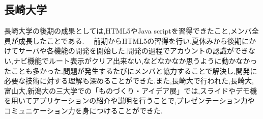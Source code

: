 \subsection{長崎大学}
長崎大学の後期の成果としては,HTML5やJava scriptを習得できたこと,メンバ全員が成長したことである.
　前期からHTML5の習得を行い,夏休みから後期にかけてサーバや各機能の開発を開始した.開発の過程でアカウントの認識ができない,ナビ機能でルート表示がクリア出来ない,などなかなか思うように動かなかったことも多かった.問題が発生するたびにメンバと協力することで解決し,開発に必要な技術に対する理解も深めることができた.また,長崎大で行われた,長崎大,富山大,新潟大の三大学での「ものづくり・アイデア展」では,スライドやデモ機を用いてアプリケーションの紹介や説明を行うことで,プレゼンテーション力やコミュニケーション力を身につけることができた.
